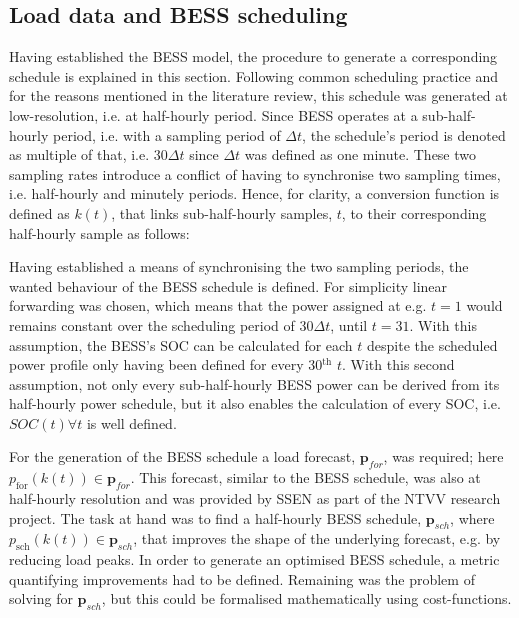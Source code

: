 \subsection{Load data and BESS scheduling}


Having established the BESS model, the procedure to generate a corresponding schedule is explained in this section.
Following common scheduling practice and for the reasons mentioned in the literature review, this schedule was generated at low-resolution, i.e. at half-hourly period.
Since BESS operates at a sub-half-hourly period, i.e. with a sampling period of $\Delta t$, the schedule's period is denoted as multiple of that, i.e. $30\Delta t$ since $\Delta t$ was defined as one minute.
These two sampling rates introduce a conflict of having to synchronise two sampling times, i.e. half-hourly and minutely periods.
Hence, for clarity, a conversion function is defined as $k(t)$, that links sub-half-hourly samples, $t$, to their corresponding half-hourly sample as follows:



Having established a means of synchronising the two sampling periods, the wanted behaviour of the BESS schedule is defined.
For simplicity linear forwarding was chosen, which means that the power assigned at e.g. $t=1$ would remains constant over the scheduling period of $30\Delta t$, until $t=31$.
With this assumption, the BESS's SOC can be calculated for each $t$ despite the scheduled power profile only having been defined for every 30$^\text{th}$ $t$.
With this second assumption, not only every sub-half-hourly BESS power can be derived from its half-hourly power schedule, but it also enables the calculation of every SOC, i.e. $SOC(t) \forall t$ is well defined.


For the generation of the BESS schedule a load forecast, $\textbf{p}_{for}$, was required; here $p_\text{for}(k(t)) \in \textbf{p}_{for}$.
This forecast, similar to the BESS schedule, was also at half-hourly resolution and was provided by SSEN as part of the NTVV research project.
The task at hand was to find a half-hourly BESS schedule, $\textbf{p}_{sch}$, where $p_\text{sch}(k(t)) \in \textbf{p}_{sch}$, that improves the shape of the underlying forecast, e.g. by reducing load peaks.
In order to generate an optimised BESS schedule, a metric quantifying improvements had to be defined.
Remaining was the problem of solving for $\textbf{p}_{sch}$, but this could be formalised mathematically using cost-functions.


